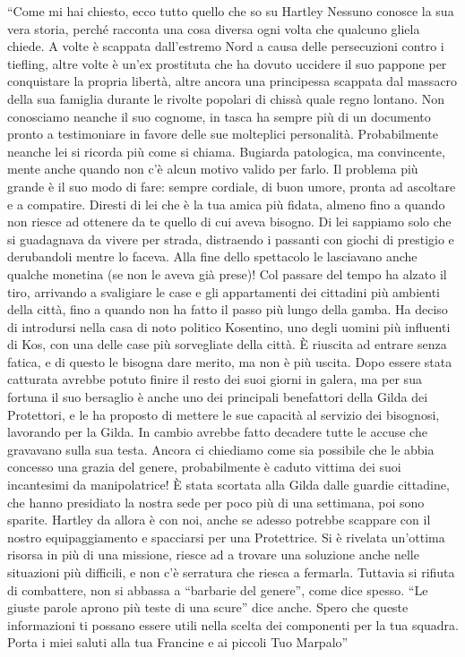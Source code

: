``Come mi hai chiesto, ecco tutto quello che so su Hartley Nessuno
conosce la sua vera storia, perché racconta una cosa diversa ogni volta
che qualcuno gliela chiede. A volte è scappata dall'estremo Nord a causa
delle persecuzioni contro i tiefling, altre volte è un'ex prostituta che
ha dovuto uccidere il suo pappone per conquistare la propria libertà,
altre ancora una principessa scappata dal massacro della sua famiglia
durante le rivolte popolari di chissà quale regno lontano. Non
conosciamo neanche il suo cognome, in tasca ha sempre più di un
documento pronto a testimoniare in favore delle sue molteplici
personalità. Probabilmente neanche lei si ricorda più come si chiama.
Bugiarda patologica, ma convincente, mente anche quando non c'è alcun
motivo valido per farlo. Il problema più grande è il suo modo di fare:
sempre cordiale, di buon umore, pronta ad ascoltare e a compatire.
Diresti di lei che è la tua amica più fidata, almeno fino a quando non
riesce ad ottenere da te quello di cui aveva bisogno. Di lei sappiamo
solo che si guadagnava da vivere per strada, distraendo i passanti con
giochi di prestigio e derubandoli mentre lo faceva. Alla fine dello
spettacolo le lasciavano anche qualche monetina (se non le aveva già
prese)! Col passare del tempo ha alzato il tiro, arrivando a svaligiare
le case e gli appartamenti dei cittadini più ambienti della città, fino
a quando non ha fatto il passo più lungo della gamba. Ha deciso di
introdursi nella casa di noto politico Kosentino, uno degli uomini più
influenti di Kos, con una delle case più sorvegliate della città. È
riuscita ad entrare senza fatica, e di questo le bisogna dare merito, ma
non è più uscita. Dopo essere stata catturata avrebbe potuto finire il
resto dei suoi giorni in galera, ma per sua fortuna il suo bersaglio è
anche uno dei principali benefattori della Gilda dei Protettori, e le ha
proposto di mettere le sue capacità al servizio dei bisognosi, lavorando
per la Gilda. In cambio avrebbe fatto decadere tutte le accuse che
gravavano sulla sua testa. Ancora ci chiediamo come sia possibile che le
abbia concesso una grazia del genere, probabilmente è caduto vittima dei
suoi incantesimi da manipolatrice! È stata scortata alla Gilda dalle
guardie cittadine, che hanno presidiato la nostra sede per poco più di
una settimana, poi sono sparite. Hartley da allora è con noi, anche se
adesso potrebbe scappare con il nostro equipaggiamento e spacciarsi per
una Protettrice. Si è rivelata un'ottima risorsa in più di una missione,
riesce ad a trovare una soluzione anche nelle situazioni più difficili,
e non c'è serratura che riesca a fermarla. Tuttavia si rifiuta di
combattere, non si abbassa a ``barbarie del genere'', come dice spesso.
``Le giuste parole aprono più teste di una scure'' dice anche. Spero che
queste informazioni ti possano essere utili nella scelta dei componenti
per la tua squadra. Porta i miei saluti alla tua Francine e ai piccoli
Tuo Marpalo''

